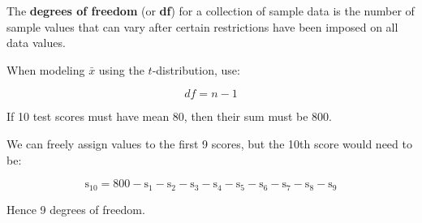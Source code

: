 \documentclass{beamer}
\begin{document}
\begin{frame}
  \begin{definition}
    The \textbf{degrees of freedom} (or \textbf{df}) for a collection of sample data is the number of sample values that can vary after certain restrictions have been imposed on all data values.

    \vspace{1mm}
    When modeling $\bar{x}$ using the $t$-distribution, use:

    \vspace{-4mm}
    \begin{equation*}
      df = n-1
    \end{equation*}
  \end{definition}\pause

  \begin{example}
    If 10 test scores must have mean 80, then their sum must be 800.\pause

    \vspace{2mm}
    We can freely assign values to the first 9 scores, but the 10th score would need to be:

    \vspace{-4mm}
    \begin{equation*}
      \text{s}_{10} = 800 - \text{s}_1 - \text{s}_2 - \text{s}_3 - \text{s}_4 - \text{s}_5 - \text{s}_6 - \text{s}_7 - \text{s}_8 - \text{s}_9
    \end{equation*}\pause

    \vspace{-4mm}
    Hence 9 degrees of freedom.
  \end{example}
\end{frame}
\end{document}
